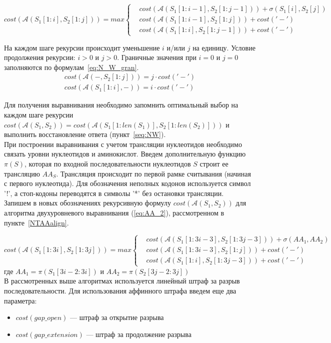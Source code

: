 \begin{equation}\label{eq:N_W_2}
cost(\mathcal{A}(S_1[1:i], S_2[1:j])) = max\left\{
\begin{aligned}
& cost(\mathcal{A}(S_1[1:i-1], S_2[1:j-1])) + \sigma(S_1[i], S_2[j])\\
& cost(\mathcal{A}(S_1[1:i-1], S_2[1:j])) + cost('-')\\
& cost(\mathcal{A}(S_1[1:i], S_2[1:j-1])) + cost('-')
\end{aligned}
\right.
\end{equation}

\indent На каждом шаге рекурсии происходит уменьшение $i$ и/или $j$ на единицу. Условие продолжения рекурсии: $i > 0$ и $j > 0$. Граничные значения при $i=0$ и $j=0$ заполняются по формулам~\ref{eq:N_W_gran}.
\begin{equation}\label{eq:N_W_gran}
\begin{aligned}
cost(\mathcal{A}(-, S_2[1:j])) = j\cdot cost('-')\\
cost(\mathcal{A}(S_1[1:i], -)) = i\cdot cost('-')
\end{aligned}
\end{equation}

\indent Для получения выравнивания необходимо запомнить оптимальный выбор на каждом шаге рекурсии $cost(\mathcal{A}(S_1, S_2))=cost(\mathcal{A}(S_1[1:len(S_1)], S_2[1:len(S_2)]))$ и выполнить восстановление ответа (пункт~\ref{seq:NW}).\\
\indent При построении выравнивания с учетом трансляции нуклеотидов необходимо связать уровни нуклеотидов и аминокислот. Введем дополнительную функцию $\pi(S)$, которая по входной последовательности нуклеотидов $S$ строит ее трансляцию $AA_S$. Трансляция происходит по первой рамке считывания (начиная с первого нуклеотида). Для обозначения неполных кодонов используется символ '!', а стоп-кодоны переводятся в символы '*' без остановки трансляции.\\
\indent Запишем в новых обозначениях рекурсивную формулу $cost(\mathcal{A}(S_1, S_2))$ для алгоритма двухуровневого выравнивания (\ref{eq:AA_2}), рассмотренном в пункте~\ref{NTAAalign}.

\begin{equation}\label{eq:AA_2}
cost(\mathcal{A}(S_1[1:3i], S_2[1:3j])) = max\left\{
\begin{aligned}
& cost(\mathcal{A}(S_1[1:3i-3], S_2[1:3j-3])) + \sigma(AA_1, AA_2)\\
& cost(\mathcal{A}(S_1[1:3i-3], S_2[1:j])) + cost('-')\\
& cost(\mathcal{A}(S_1[1:i], S_2[1:3j-3])) + cost('-')
\end{aligned}
\right.
\end{equation}
где $AA_1=\pi(S_1[3i-2:3i])$ и $AA_2=\pi(S_2[3j-2:3j])$\\
\indent В рассмотренных выше алгоритмах используется линейный штраф за разрыв последовательности. Для использования аффинного штрафа введем еще два параметра:
\begin{itemize}
	\item $cost(gap\_open)$ --- штраф за открытие разрыва
	\item $cost(gap\_extension)$ --- штраф за продолжение разрыва
\end{itemize}

